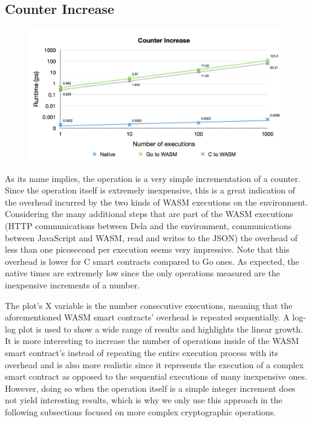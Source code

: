\documentclass[11pt, a4paper, twoside, openright]{article}
\begin{document}
\subsection{Counter Increase}

\begin{figure}[H]
 \centering
  \includegraphics[width=13cm]{increase_counter.png}
\end{figure}

As its name implies, the operation is a very simple incrementation of a counter. Since the operation itself is extremely inexpensive, this is a great indication of the overhead incurred by the two kinds of WASM executions on the environment. Considering the many additional steps that are part of the WASM executions (HTTP communications between Dela and the environment, communications between JavaScript and WASM, read and writes to the JSON) the overhead of less than one picosecond per execution seems very impressive. Note that this overhead is lower for C smart contracts compared to Go ones. As expected, the native times are extremely low since the only operations measured are the inexpensive increments of a number.

The plot's X variable is the number consecutive executions, meaning that the aforementioned WASM smart contracts' overhead is repeated sequentially. A log-log plot is used to show a wide range of results and highlights the linear growth. It is more interesting to increase the number of operations inside of the WASM smart contract's instead of repeating the entire execution process with its overhead and is also more realistic since it represents the execution of a complex smart contract as opposed to the sequential executions of many inexpensive ones. However, doing so when the operation itself is a simple integer increment does not yield interesting results, which is why we only use this approach in the following subsections focused on more complex cryptographic operations.
\end{document}
